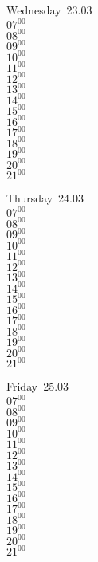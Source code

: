 \documentclass[11pt,a4paper]{book}\usepackage[]{graphicx}\usepackage[]{color}
\begin{document}
\begin{weekdaybox}
  Wednesday~23.03\\
  { 
  \vfill
  $07^{00}$\\
$08^{00}$\\
$09^{00}$\\
$10^{00}$\\
$11^{00}$\\
$12^{00}$\\
$13^{00}$\\
$14^{00}$\\
$15^{00}$\\
$16^{00}$\\
$17^{00}$\\
$18^{00}$\\
$19^{00}$\\
$20^{00}$\\
$21^{00}$\\
  }
\end{weekdaybox}
\clearpage
\begin{headerbox}
\end{headerbox}
\begin{weekdaybox}
  Thursday~24.03\\
  { 
  \vfill
  $07^{00}$\\
$08^{00}$\\
$09^{00}$\\
$10^{00}$\\
$11^{00}$\\
$12^{00}$\\
$13^{00}$\\
$14^{00}$\\
$15^{00}$\\
$16^{00}$\\
$17^{00}$\\
$18^{00}$\\
$19^{00}$\\
$20^{00}$\\
$21^{00}$\\
  }
\end{weekdaybox} 
\begin{weekdaybox}
  Friday~25.03\\
  { 
  \vfill
  $07^{00}$\\
$08^{00}$\\
$09^{00}$\\
$10^{00}$\\
$11^{00}$\\
$12^{00}$\\
$13^{00}$\\
$14^{00}$\\
$15^{00}$\\
$16^{00}$\\
$17^{00}$\\
$18^{00}$\\
$19^{00}$\\
$20^{00}$\\
$21^{00}$\\
  }
\end{weekdaybox}
\end{document}
